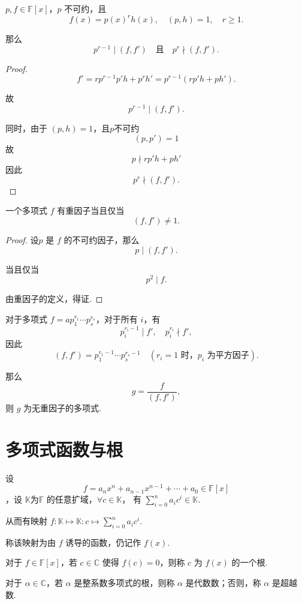 \begin{proposition}
	\( p, f \in \mathbb{F}[x] \)，\( p \) 不可约，且
	\[ f(x) = p(x)^r h(x), \quad (p, h) = 1, \quad r \geq 1. \]
	
	那么
	\[ p^{r-1} \mid (f, f') \quad \text{且} \quad p^r \nmid (f, f'). \]
	
\end{proposition}
\begin{proof}
	\[ f' = r p^{r-1} p' h + p^r h' = p^{r-1} (r p' h + p h'). \]
	
	故
	\[ p^{r-1} \mid (f, f'). \]
	
	同时，由于 \( (p, h) = 1 \)，且$p$不可约
	\[(p,p')=1\]
	故
	\[ p\nmid r p' h + p h' \]
	因此
	\[ p^r \nmid (f, f'). \]
	

\end{proof}
\begin{corollary}\label{1.3.20}
	一个多项式 \( f \) 有重因子当且仅当
	\[ (f, f') \neq 1. \]
	
\end{corollary}
\begin{proof}
	设\( p \) 是 \( f \) 的不可约因子，那么
	\[ p \mid (f, f'). \]
	
	当且仅当
	\[ p^2 \mid f. \]
	
	由重因子的定义，得证.
	
\end{proof}

对于多项式 \( f = a p_1^{r_1} \cdots p_s^{r_s} \)，对于所有 \( i \)，有
\[ p_i^{r_i - 1} \mid f', \quad p_i^{r_i} \nmid f', \]
因此
\[ (f, f') = p_1^{r_1 - 1} \cdots p_s^{r_s - 1} \quad (r_i = 1 \text{ 时，} p_i \text{ 为平方因子}). \]

那么
\[ g = \frac{f}{(f, f')}, \]
则 \( g \) 为无重因子的多项式.
\section{多项式函数与根}
\begin{definition}
	设 \[ f = a_n x^n + a_{n-1} x^{n-1} + \cdots + a_0 \in \mathbb{F}[x]\]，设 \(\mathbb{K}\text{为} \mathbb{F} \) 的任意扩域，\( \forall c \in \mathbb{K} \)， 有 \( \sum\limits_{i=0}^n a_i c^i \in \mathbb{K} \).
	
	从而有映射 \( f: \mathbb{K} \mapsto \mathbb{K}: c \mapsto \sum\limits_{i=0}^n a_i c^i \).
	
	称该映射为由 \( f \) 诱导的函数，仍记作 \( f(x) \).
	
	对于 \( f \in \mathbb{F}[x] \)，若 \( c \in \mathbb{C} \) 使得 \( f(c) = 0 \)，则称 \( c \) 为 \( f(x) \) 的一个根.
	
	对于 \( \alpha \in \mathbb{C} \)，若 \( \alpha \) 是整系数多项式的根，则称 \( \alpha \) 是代数数；否则，称 \( \alpha \) 是超越数.
\end{definition}


